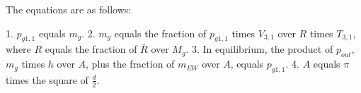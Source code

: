 The equations are as follows:

1. \( p_{g1,1} \) equals \( m_g \).
2. \( m_g \) equals the fraction of \( p_{g1,1} \) times \( V_{3,1} \) over \( R \) times \( T_{3,1} \), where \( R \) equals the fraction of \( \bar{R} \) over \( M_g \).
3. In equilibrium, the product of \( p_{out} \), \( m_g \) times \( h \) over \( A \), plus the fraction of \( m_{EW} \) over \( A \), equals \( p_{g1,1} \).
4. \( A \) equals \( \pi \) times the square of \( \frac{d}{2} \).
